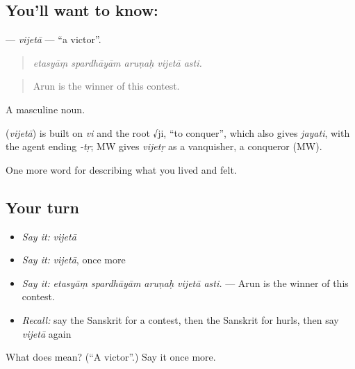 \subsection*{You'll want to know: }
\textbf{} — \emph{vijetā} — \textquotedblleft{}a victor\textquotedblright{}.

\begin{quote}
    
\end{quote}

\begin{quote}
\emph{etasyāṃ spardhāyām aruṇaḥ vijetā asti.}
\end{quote}

\begin{quote}
Arun is the winner of this contest.
\end{quote}

A masculine noun.

\begin{cousinweb}
\textbf{} (\emph{vijetā}) is built on \emph{vi} and the root √ji, \textquotedblleft{}to conquer\textquotedblright{}, which also gives \emph{jayati}, with the agent ending \emph{-tṛ}; MW gives \emph{vijetṛ} as a vanquisher, a conqueror (MW).
\end{cousinweb}

\begin{grammarlens}[title={What you've built}]
One more word for describing what you lived and felt.
\end{grammarlens}

\subsection*{Your turn}
\begin{itemize}
\raggedright
  \item \emph{Say it:} \emph{vijetā}
  \item \emph{Say it:} \emph{vijetā}, once more
  \item \emph{Say it:} \emph{etasyāṃ spardhāyām aruṇaḥ vijetā asti.} — Arun is the winner of this contest.
  \item \emph{Recall:} say the Sanskrit for a contest, then the Sanskrit for hurls, then say \emph{vijetā} again
\end{itemize}

\begin{tcolorbox}[breakable,colback=teal!4,colframe=teal!35!black,title={Before you move on}]
What does  mean? (\textquotedblleft{}A victor\textquotedblright{}.) Say it once more.
\end{tcolorbox}

